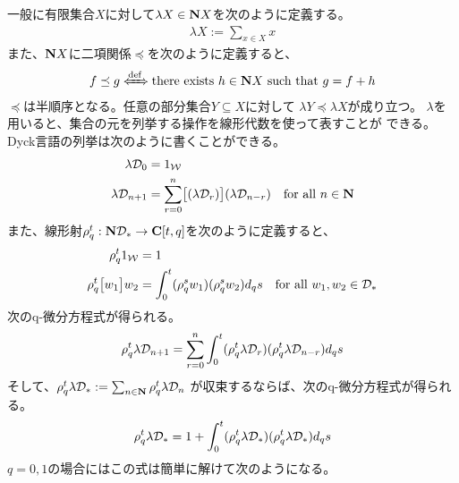 {	一般に有限集合$X$に対して$\lambda X\in \mathbf{N} X$を次のように定義する。
	\begin{equation*}\begin{split}
		\lambda X := \sum_{x\in X} x
	\end{split}\end{equation*}
	また、$\mathbf{N} X$に二項関係$\preceq$を次のように定義すると、
	\begin{equation*}\begin{split}
		f\preceq g \xiff{\dfn} \text{there exists } h\in\sizen X
		\text{ such that } g = f + h
	\end{split}\end{equation*}
	$\preceq$は半順序となる。任意の部分集合$Y\subseteq X$に対して
	$\lambda Y\preceq\lambda X$が成り立つ。
	$\lambda$を用いると、集合の元を列挙する操作を線形代数を使って表すことが
	できる。Dyck言語の列挙は次のように書くことができる。
	\begin{equation*}\begin{split}
		\lambda{\ensuremath{{\mathcal{D}}}}_0 &= 1_{{\mathcal{W}}} \\ 
		\lambda{\ensuremath{{\mathcal{D}}}}_{n+1} &= \sum_{r=0}^n \bigl[{(\lambda{\ensuremath{{\mathcal{D}}}}_r)}\bigr](\lambda{\ensuremath{{\mathcal{D}}}}_{n-r})
		\quad\text{for all } n\in\mathbf{N}
	\end{split}\end{equation*}
	また、線形射$\rho^t_q:\mathbf{N}{{\mathcal{D}}}_*\to\mathbf{C}[t,q]$を次のように定義すると、
	\begin{equation*}\begin{split}
		\rho^t_q 1_{{\mathcal{W}}} &= 1 \\
		\rho^t_q \bigl[{w_1}\bigr] w_2 &= \int_0^t (\rho^s_q w_1)(\rho^s_q w_2) d_qs
		\quad\text{for all } w_1,w_2\in{\ensuremath{{\mathcal{D}}}}_*
	\end{split}\end{equation*}
	次のq-微分方程式が得られる。
	\begin{equation*}\begin{split}
		\rho^t_q \lambda{\ensuremath{{\mathcal{D}}}}_{n+1} = \sum_{r=0}^n \int_0^t 
		(\rho^t_q\lambda{\ensuremath{{\mathcal{D}}}}_r)(\rho^t_q\lambda{\ensuremath{{\mathcal{D}}}}_{n-r}) d_qs
	\end{split}\end{equation*}
	そして、$\rho^t_q\lambda{\ensuremath{{\mathcal{D}}}}_*:=\sum_{n\in\mathbf{N}} \rho^t_q\lambda{\ensuremath{{\mathcal{D}}}}_n$
	が収束するならば、次のq-微分方程式が得られる。
	\begin{equation*}\begin{split}
		\rho^t_q\lambda{\ensuremath{{\mathcal{D}}}}_* = 1 + \int_0^t 
		(\rho^t_q\lambda{\ensuremath{{\mathcal{D}}}}_*)(\rho^t_q\lambda{\ensuremath{{\mathcal{D}}}}_*) d_qs
	\end{split}\end{equation*}
	$q=0,1$の場合にはこの式は簡単に解けて次のようになる。
}
